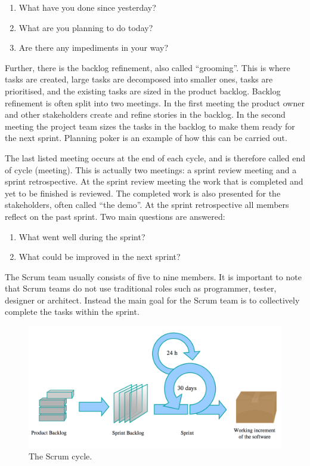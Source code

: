 \begin{enumerate}
  \item What have you done since yesterday?
  \item What are you planning to do today?
  \item Are there any impediments in your way?
\end{enumerate}

Further, there is the backlog refinement, also called ``grooming''. This is where tasks are created, large tasks are decomposed into smaller ones, tasks are prioritised, and the existing tasks are sized in the product backlog. Backlog refinement is often split into two meetings. In the first meeting the product owner and other stakeholders create and refine stories in the backlog. In the second meeting the project team sizes the tasks in the backlog to make them ready for the next sprint. Planning poker is an example of how this can be carried out.

The last listed meeting occurs at the end of each cycle, and is therefore called end of cycle (meeting). This is actually two meetings: a sprint review meeting and a sprint retrospective. At the sprint review meeting the work that is completed and yet to be finished is reviewed. The completed work is also presented for the stakeholders, often called  ``the demo''. At the sprint retrospective all members reflect on the past sprint. Two main questions are answered:

\begin{enumerate}
  \item What went well during the sprint?
  \item What could be improved in the next sprint?
\end{enumerate}

The Scrum team usually consists of five to nine members. It is important to note that Scrum teams do not use traditional roles such as programmer, tester, designer or architect. Instead the main goal for the Scrum team is to collectively complete the tasks within the sprint.

\begin{figure}
\centering
\includegraphics[width=150mm]{images/chapters/development_models/Scrum.png}
\caption{The Scrum cycle.}
\label{scrum}
\end{figure}

